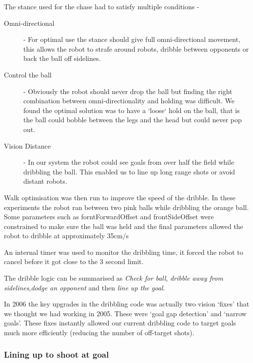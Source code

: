 The stance used for the chase had to satisfy multiple conditions -
\begin{description}
    \item[Omni-directional] - For optimal use the stance should
    give full omni-directional movement, this allows the robot
    to strafe around robots, dribble between opponents or back the
    ball off sidelines.
    \item[Control the ball] - Obviously the robot should never drop the
    ball but finding the right combination between omni-directionality
    and holding was difficult. We found the optimal solution
    was to have a `loose` hold on the ball, that is the ball could
    bobble between the legs and the head but could never pop out.
    \item[Vision Distance] - In our system the robot could see goals from over
    half the field while dribbling the ball. This enabled us to line
    up long range shots or avoid distant robots.
\end{description}

Walk optimisation was then run to improve the speed of the dribble.
In these experiments the robot ran between two pink balls while
dribbling the orange ball. Some parameters such as
forntForwardOffset and frontSideOffset were constrained to make sure
the ball was held and the final parameters allowed the robot to
dribble at approximately 35cm/s

An internal timer was used to monitor the dribbling time, it forced
the robot to cancel before it got close to the 3 second limit.

The dribble logic can be summarised as \emph{Check for ball},
\emph{dribble away from sidelines},\emph{dodge an opponent} and then  \emph{line up the goal}.

In 2006 the key upgrades in the dribbling code was actually two vision `fixes' that we thought we had working in 2005. These were `goal gap detection' and `narrow goals'. These fixes instantly allowed our current dribbling code to target goals much more efficiently (reducing the number of off-target shots).

\subsubsection{Lining up to shoot at goal}

